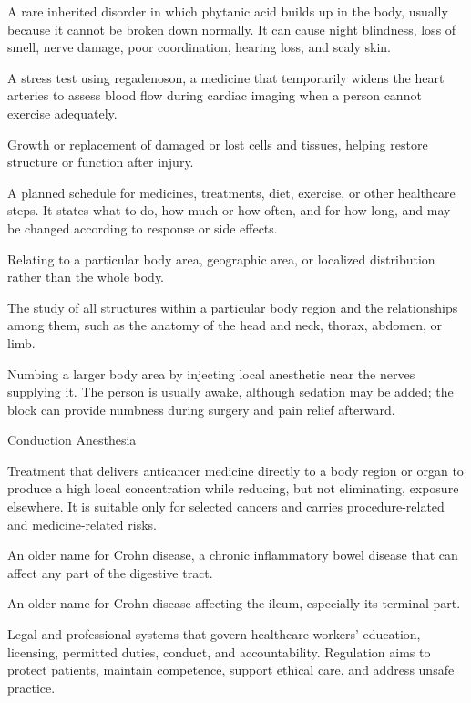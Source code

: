  A rare inherited disorder in which phytanic acid builds up in the body, usually because it cannot be broken down normally. It can cause night blindness, loss of smell, nerve damage, poor coordination, hearing loss, and scaly skin.

 A stress test using regadenoson, a medicine that temporarily widens the heart arteries to assess blood flow during cardiac imaging when a person cannot exercise adequately.

 Growth or replacement of damaged or lost cells and tissues, helping restore structure or function after injury.

 A planned schedule for medicines, treatments, diet, exercise, or other healthcare steps. It states what to do, how much or how often, and for how long, and may be changed according to response or side effects.

 Relating to a particular body area, geographic area, or localized distribution rather than the whole body.

 The study of all structures within a particular body region and the relationships among them, such as the anatomy of the head and neck, thorax, abdomen, or limb.

 Numbing a larger body area by injecting local anesthetic near the nerves supplying it. The person is usually awake, although sedation may be added; the block can provide numbness during surgery and pain relief afterward.

\synonyms
Conduction Anesthesia

 Treatment that delivers anticancer medicine directly to a body region or organ to produce a high local concentration while reducing, but not eliminating, exposure elsewhere. It is suitable only for selected cancers and carries procedure-related and medicine-related risks.

 An older name for Crohn disease, a chronic inflammatory bowel disease that can affect any part of the digestive tract.

 An older name for Crohn disease affecting the ileum, especially its terminal part.

 Legal and professional systems that govern healthcare workers' education, licensing, permitted duties, conduct, and accountability. Regulation aims to protect patients, maintain competence, support ethical care, and address unsafe practice.

